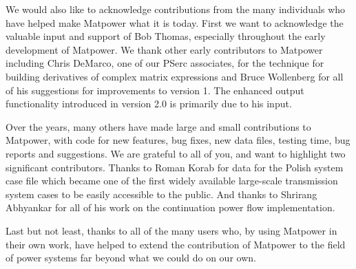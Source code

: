\documentclass[12pt]{article}
\newcommand{\matpower}[0]{{\sc Matpower}}
\newcommand{\pserc}[0]{{\sc PSerc}}
\numberwithin{equation}{section}
\numberwithin{table}{section}
\numberwithin{figure}{section}
\begin{document}
We would also like to acknowledge contributions from the many individuals who have helped make \matpower{} what it is today. First we want to acknowledge the valuable input and support of Bob Thomas, especially throughout the early development of \matpower{}. We thank other early contributors to \matpower{} including Chris DeMarco, one of our \pserc{} associates, for the technique for building derivatives of complex matrix expressions and Bruce Wollenberg for all of his suggestions for improvements to version 1. The enhanced output functionality introduced in version 2.0 is primarily due to his input.

Over the years, many others have made large and small contributions to \matpower{}, with code for new features, bug fixes, new data files, testing time, bug reports and suggestions. We are grateful to all of you, and want to highlight two significant contributors. Thanks to Roman Korab for data for the Polish system case file which became one of the first widely available large-scale transmission system cases to be easily accessible to the public. And thanks to Shrirang Abhyankar for all of his work on the continuation power flow implementation.

Last but not least, thanks to all of the many users who, by using \matpower{} in their own work, have helped to extend the contribution of \matpower{} to the field of power systems far beyond what we could do on our own.

\end{document}
